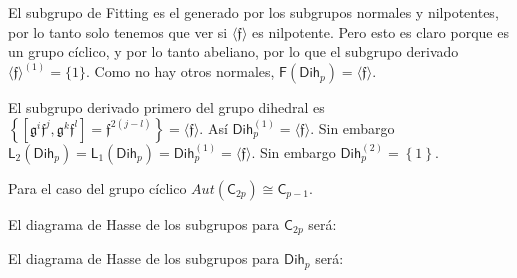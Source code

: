 \documentclass[12pt,a4paper,fleqn,spanish,final,openright]{extbook}
\theoremstyle{definition}
\theoremstyle{remark}
\begin{document}
El subgrupo de Fitting es el generado por los subgrupos normales y nilpotentes, por lo tanto solo tenemos que ver si $\langle \mathfrak{f} \rangle$ es nilpotente. Pero esto es claro porque es un grupo cíclico, y por lo tanto abeliano, por lo que el subgrupo derivado ${\langle \mathfrak{f} \rangle}^{(1)} = \{1\}$. Como no hay otros normales, $\mathsf{F}({\mathsf{Dih}}_{p})=\langle \mathfrak{f} \rangle$.

El subgrupo derivado primero del grupo dihedral es $\left\{ \left[ \mathfrak{g}^{i}\mathfrak{f}^{j},\mathfrak{g}^{k}\mathfrak{f}^{l} \right]=\mathfrak{f}^{2(j-l)} \right\} = \langle \mathfrak{f} \rangle$. Así $\mathsf{Dih}_{p}^{(1)} = \langle \mathfrak{f} \rangle$. Sin embargo ${\mathsf{L}}_{2}\left( {\mathsf{Dih}}_{p}
\right) = {\mathsf{L}}_{1}\left( {\mathsf{Dih}}_{p} \right) = \mathsf{Dih}_{p}^{(1)} = \langle \mathfrak{f} \rangle$.
 Sin embargo ${\mathsf{Dih}}_{p}^{(2)} = \left\{1\right\}$.


Para el caso del grupo cíclico $Aut(\mathsf{C}_{2p})   \cong    \mathsf{C}_{p-1}$.


El diagrama de Hasse de los subgrupos para $\mathsf{C}_{2p}$ será:

\begin{center}
\end{center}

El diagrama de Hasse de los subgrupos para $\mathsf{Dih}_{p}$ será:
\end{document}
